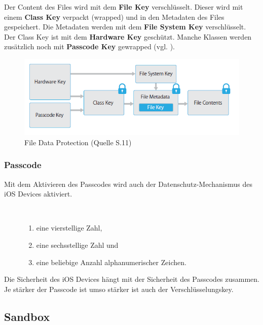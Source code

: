 Der Content des Files wird mit dem \textbf{File Key} verschlüsselt. Dieser wird mit einem \textbf{Class Key} verpackt (wrapped) und in den Metadaten des Files gespeichert. Die Metadaten werden mit dem \textbf{File System Key} verschlüsselt. Der Class Key ist mit dem \textbf{Hardware Key} geschützt. Manche Klassen werden zusätzlich noch mit \textbf{Passcode Key} gewrapped (vgl. \cite{iOSSec[5], iOSSec[2],iOSSec[1], Apple[4], Apple[5], Apple[6], Apple[3]}).
\begin{figure}[hp!]
        \centering
        \includegraphics[scale=0.75]{fileDataProtection.PNG}
        \caption{File Data Protection (Quelle \cite{Apple[4]} S.11)}
        \label{fig:FileDataProtection}
\end{figure}

\subsubsection{Passcode}
\label{sec:Passcode}

Mit dem Aktivieren des Passcodes wird auch der Datenschutz-Mechanismus des iOS Devices aktiviert. 
\begin{description}
    \item[\parbox{\textwidth} {Der User hat die Möglichkeit, zwischen drei Einstellungsvarianten des Passcodes zu variieren}]~\par
   \begin{enumerate}
        \item eine vierstellige Zahl,
        \item eine sechsstellige Zahl und
        \item eine beliebige Anzahl alphanumerischer Zeichen.
    \end{enumerate}
\end{description} 

Die Sicherheit des iOS Devices hängt mit der Sicherheit des Passcodes zusammen. Je stärker der Passcode ist umso stärker ist auch der Verschlüsselungskey. 

\subsection{Sandbox}
\label{sec:Sandbox}

